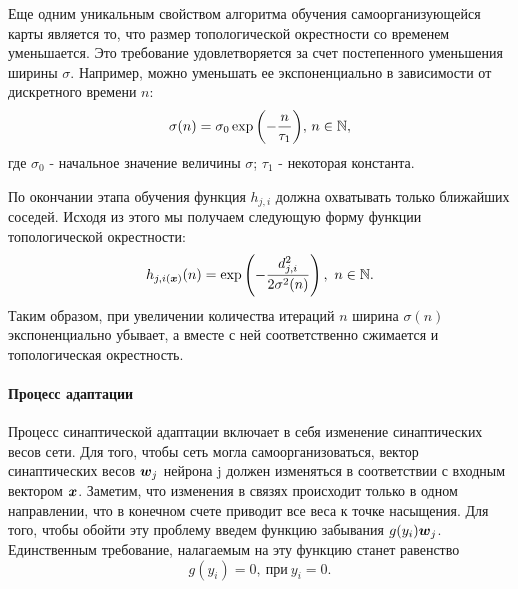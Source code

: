 \documentclass[a4paper,12pt]{report}
\begin{document}
Еще одним уникальным свойством алгоритма обучения самоорганизующейся
карты является то, что размер топологической окрестности со временем
уменьшается. Это требование удовлетворяется за счет постепенного
уменьшения ширины $\sigma$. Например, можно уменьшать ее
экспоненциально в зависимости от дискретного времени $n$:
\begin{equation}
    \sigma(n) = \sigma_0\exp{\left( - \frac{n}{\tau_1}\right)},\, n
    \in \mathbb{N},
\end{equation}
где $\sigma_0$ - начальное значение величины $\sigma$; $\tau_1$ -
некоторая константа.

%

По окончании этапа обучения функция $h_{j,i}$ должна охватывать только
ближайших соседей. Исходя из этого мы получаем следующую форму функции
топологической окрестности:
\begin{equation}
    h_{j,i(\boldsymbol{x})}(n) = \exp\left( -\frac{d_{j,i}^{2}}{2\sigma^2(n)} \right),\ n \in \mathbb{N}.
\end{equation}
Таким образом, при увеличении количества итераций $n$ ширина
$\sigma(n)$ экспоненциально убывает, а вместе с ней соответственно
сжимается и топологическая окрестность.

\paragraph{Процесс адаптации}
Процесс синаптической адаптации включает в себя изменение
синаптических весов сети. Для того, чтобы сеть могла
самоорганизоваться, вектор синаптических весов $\boldsymbol{w}_j$ нейрона j
должен изменяться в соответствии с входным вектором $\boldsymbol{x}$.
Заметим, что изменения в связях происходит только в одном направлении,
что в конечном счете приводит все веса к точке насыщения. Для того,
чтобы обойти эту проблему введем функцию забывания $g(y_i)\boldsymbol{w}_j$.
Единственным требование, налагаемым на эту функцию станет равенство
\begin{equation} \label{eq:gy}
    g(y_i) = 0,\ \text{при}\ y_i = 0.
\end{equation}
\end{document}
